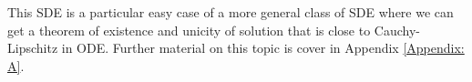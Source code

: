 	This SDE is a particular easy case of a more general class of SDE where we can get a theorem of existence and unicity of solution that is close to Cauchy-Lipschitz in ODE. Further material on this topic is cover in Appendix \ref{Appendix: A}.
%
%
%
%
